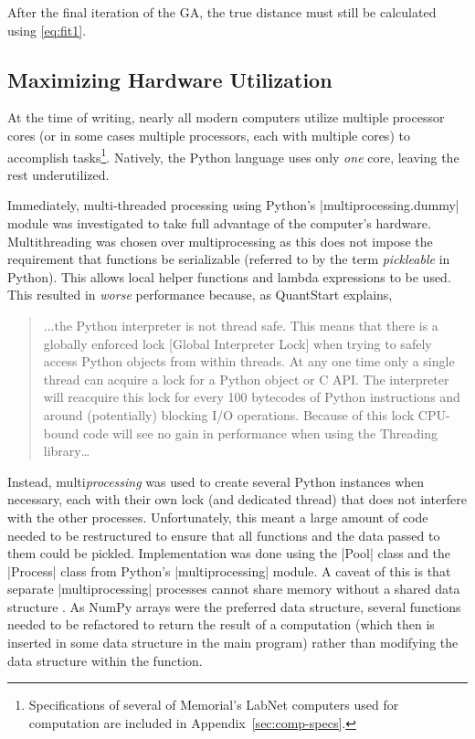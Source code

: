 After the final iteration of the GA, the true distance must still be calculated
using \eqref{eq:fit1}.

\subsection{Maximizing Hardware Utilization}\label{ssec:hardware}
At the time of writing, nearly all modern computers utilize multiple processor
cores (or in some cases multiple processors, each with multiple cores) to 
accomplish tasks\footnote{Specifications of several of Memorial's LabNet 
computers used for computation are included in Appendix~\ref{sec:comp-specs}.}.
Natively, the Python language uses only {\em one} core, leaving the rest 
underutilized. 

Immediately, multi-threaded processing using Python's 
|multiprocessing.dummy| module was investigated to take full 
advantage of the computer's hardware. Multithreading was chosen over
multiprocessing as this does not impose the requirement that functions 
be serializable (referred to by the term {\em pickleable} in Python). This 
allows local helper functions and lambda expressions to be used.
This resulted in {\em worse} performance because, as QuantStart explains,
\begin{quote}
	...the Python interpreter is not thread safe. This means that there is a
	globally enforced lock [Global Interpreter Lock] when trying to safely 
	access Python objects from within threads. At any one time only a single
	thread can acquire a lock for a Python object or C API. The interpreter 
	will reacquire this lock for every 100 bytecodes of Python instructions
	and around (potentially) blocking I/O operations. Because of this lock 
	CPU-bound code will see no gain in performance when using the Threading 
	library\ldots
	\cite{quantstart}
\end{quote}
Instead, multi{\em processing} was used to create several Python instances
when necessary, each with their own lock (and dedicated thread) that does 
not interfere with the other processes. Unfortunately, this meant a large
amount of code needed to be restructured to ensure that all functions and 
the data passed to them could be pickled. Implementation was done using 
the |Pool| class and the |Process| class from Python's |multiprocessing| 
module. A caveat of this is that separate |multiprocessing| processes cannot 
share memory without a shared data structure \cite{wang}. As NumPy arrays
were the preferred data structure, several functions needed to be refactored 
to return the result of a computation (which then is inserted in some data 
structure in the main program) rather than modifying the data structure 
within the function.

